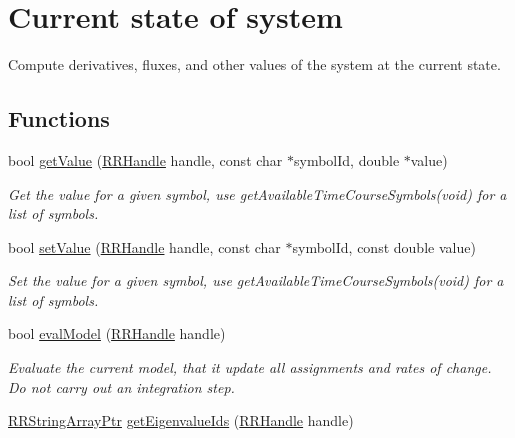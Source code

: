 \hypertarget{group__state}{\section{Current state of system}
\label{group__state}
}


Compute derivatives, fluxes, and other values of the system at the current state.  


\subsection*{Functions}
\begin{DoxyCompactItemize}
\item 
bool \hyperlink{group__state_ga7ff97de8f8ea4b16f6867ed1c24b75f6}{get\-Value} (\hyperlink{rrc__types_8h_a1d68f0592372208fa5a5f2799ea4b3ae}{R\-R\-Handle} handle, const char $\ast$symbol\-Id, double $\ast$value)
\begin{DoxyCompactList}\small\item\em Get the value for a given symbol, use get\-Available\-Time\-Course\-Symbols(void) for a list of symbols. \end{DoxyCompactList}\item 
bool \hyperlink{group__state_ga68328fbeb920109b943dfc61d9585f1e}{set\-Value} (\hyperlink{rrc__types_8h_a1d68f0592372208fa5a5f2799ea4b3ae}{R\-R\-Handle} handle, const char $\ast$symbol\-Id, const double value)
\begin{DoxyCompactList}\small\item\em Set the value for a given symbol, use get\-Available\-Time\-Course\-Symbols(void) for a list of symbols. \end{DoxyCompactList}\item 
bool \hyperlink{group__state_ga8f5b221fd8d82bc44f43f2742122f91a}{eval\-Model} (\hyperlink{rrc__types_8h_a1d68f0592372208fa5a5f2799ea4b3ae}{R\-R\-Handle} handle)
\begin{DoxyCompactList}\small\item\em Evaluate the current model, that it update all assignments and rates of change. Do not carry out an integration step. \end{DoxyCompactList}\item 
\hyperlink{rrc__types_8h_a7c9475df6c7337d99482b13a365e7596}{R\-R\-String\-Array\-Ptr} \hyperlink{group__state_gab504f19865db9d18456dd887f4f14d60}{get\-Eigenvalue\-Ids} (\hyperlink{rrc__types_8h_a1d68f0592372208fa5a5f2799ea4b3ae}{R\-R\-Handle} handle)

\end{DoxyCompactItemize}

